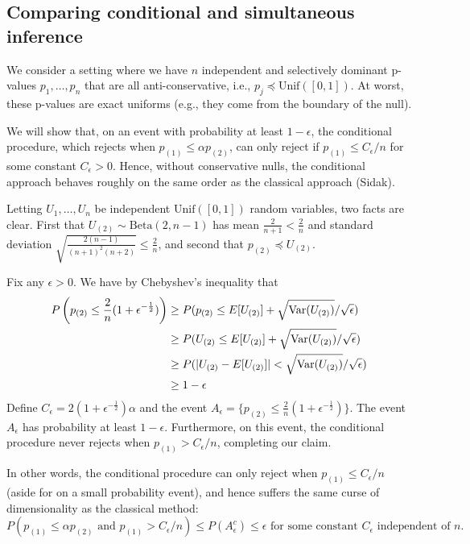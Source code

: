 \documentclass{article}
\newcommand{\Var}{\textup{Var}}
\begin{document}
\begin{appendix}
\subsection{Comparing conditional and simultaneous inference}
\label{sec:beta_dist_appdx}

We consider a setting where we have $n$ independent and selectively dominant p-values $p_1, \dots, p_n$ that are all anti-conservative, i.e.,  $p_j \preceq \text{Unif}([0, 1])$. At worst, these p-values are exact uniforms (e.g., they come from the boundary of the null). 

We will show that, on an event with probability at least $1-\epsilon$, the conditional procedure, which rejects when $p_{(1)} \leq \alpha p_{(2)}$, can only reject if $p_{(1)} \leq C_{\epsilon}/n$ for some constant $C_{\epsilon} > 0$. Hence, without conservative nulls, the conditional approach behaves roughly on the same order as the classical approach (Sidak).   

Letting $U_1, \dots, U_n$ be independent $\text{Unif}([0, 1])$ random variables, two facts are clear. First that $U_{(2)} \sim \text{Beta}(2, n-1)$ has mean $\frac{2}{n + 1} < \frac{2}{n}$ and standard deviation $\sqrt{\frac{2(n-1)}{(n+1)^2(n+2)}} \leq \frac{2}{n}$, and second that $p_{(2)} \preceq U_{(2)}$. 

Fix any $\epsilon > 0$. We have by Chebyshev's inequality that  
\begin{align*}
    P\left(p_{(2)} \leq \frac{2}{n}(1 + \epsilon^{-\frac{1}{2}})\right) &\geq P(p_{(2)} \leq E[U_{(2)}] + \sqrt{\Var(U_{(2)})}/\sqrt{\epsilon})\\
    &\geq P(U_{(2)} \leq E[U_{(2)}] + \sqrt{\Var(U_{(2)})}/\sqrt{\epsilon})\\
    &\geq P(|U_{(2)} - E[U_{(2)}]| < \sqrt{\Var(U_{(2)})}/\sqrt{\epsilon} ) \\
    &\geq 1 - \epsilon
\end{align*}
Define $C_{\epsilon} = 2(1 + \epsilon^{-\frac{1}{2}})\alpha$ and the event $A_{\epsilon} = \{ p_{(2)} \leq \frac{2}{n}(1 + \epsilon^{-\frac{1}{2}})\}$. The event $A_{\epsilon}$ has probability at least $1-\epsilon$. Furthermore, on this event, the conditional procedure never rejects when $p_{(1)} > C_{\epsilon}/n$, completing our claim. 

In other words, the conditional procedure can only reject when $p_{(1)} \leq C_{\epsilon}/n$ (aside for on a small probability event), and hence suffers the same curse of dimensionality as the classical method:
\begin{equation*}
    P(p_{(1)} \leq \alpha p_{(2)} \text{ and } p_{(1)} > C_{\epsilon}/n) \leq P(A_{\epsilon}^c) \leq \epsilon \text{ for some constant } C_{\epsilon} \text{ independent of } n.  
\end{equation*}



\end{appendix}
\end{document}
